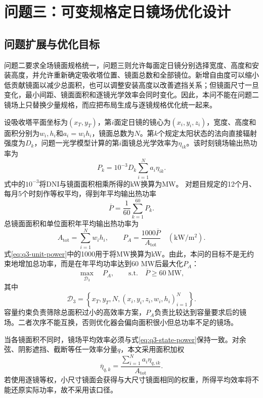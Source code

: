 \section{问题三：可变规格定日镜场优化设计}

\subsection{问题扩展与优化目标}

问题二要求全场镜面规格统一，问题三则允许每面定日镜分别选择宽度、高度和安装高度，并允许重新确定吸收塔位置、镜面总数和全部镜位。新增自由度可以缩小低贡献镜面以减少总面积，也可以调整安装高度以改善遮挡关系；但镜面尺寸一旦变化，最小间距、镜面面积和逐镜光学效率会同时变化。因此，本问不能在问题二镜场上只替换少量规格，而应把布局生成与逐镜规格优化统一起来。

设吸收塔平面坐标为$(x_T,y_T)$，第$i$面定日镜的镜心为$(x_i,y_i,z_i)$，宽度、高度和面积分别为$w_i,h_i$和$a_i=w_ih_i$，镜面总数为$N$。第$k$个规定太阳状态的法向直接辐射强度为$D_k$，问题一光学模型计算的第$i$面镜总光学效率为$\eta_{ik}$。该时刻镜场输出热功率为
\begin{equation}
 P_k=10^{-3}D_k\sum_{i=1}^{N}a_i\eta_{ik}.
 \label{eq:q3-state-power}
\end{equation}
式中的$10^{-3}$将DNI与镜面面积相乘所得的kW换算为MW。
对题目规定的12个月、每月5个时刻作等权平均，得到年平均输出热功率
\begin{equation}
 \overline P=\frac{1}{60}\sum_{k=1}^{60}P_k.
 \label{eq:q3-annual-power}
\end{equation}
总镜面面积和单位面积年平均输出热功率为
\begin{equation}
 A_{\mathrm{tot}}=\sum_{i=1}^{N}w_ih_i,
 \qquad
 P_A=\frac{1000\overline P}{A_{\mathrm{tot}}}\quad(\mathrm{kW/m^2}).
 \label{eq:q3-unit-power}
\end{equation}
式\eqref{eq:q3-unit-power}中的1000用于将MW换算为kW。由此，本问的目标不是无约束地增加总功率，而是在年平均功率达到60 MW后最大化$P_A$：
\begin{equation}
 \max_{\mathcal D_3}\quad P_A,
 \qquad
 \mathrm{s.t.}\quad \overline P\ge60\ \mathrm{MW},
 \label{eq:q3-objective}
\end{equation}
其中
\[
 \mathcal D_3=\left\{x_T,y_T,N,(x_i,y_i,z_i,w_i,h_i)_{i=1}^{N}\right\}.
\]
容量约束负责筛除总面积过小的高效率方案，$P_A$负责比较达到容量要求后的镜场。二者次序不能互换，否则优化器会偏向面积很小但总功率不足的镜场。

当各镜面积不同时，镜场平均效率必须与式\eqref{eq:q3-state-power}保持一致。对余弦、阴影遮挡、截断等任一效率分量$q$，本文采用面积加权
\begin{equation}
 \overline\eta_{q,k}
 =\frac{\sum_{i=1}^{N}a_i\eta_{q,ik}}{A_{\mathrm{tot}}}.
 \label{eq:q3-area-weighted-efficiency}
\end{equation}
若使用逐镜等权，小尺寸镜面会获得与大尺寸镜面相同的权重，所得平均效率将不能还原实际功率，故不采用该口径。

